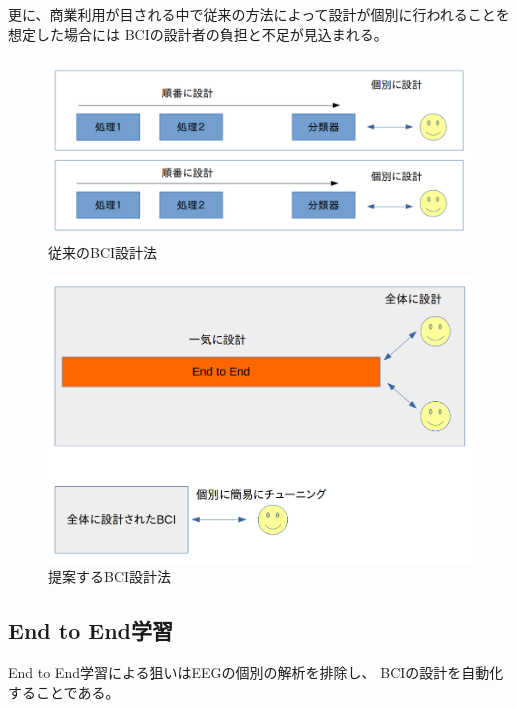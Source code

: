 更に、商業利用が目される中で従来の方法によって設計が個別に行われることを想定した場合には
BCIの設計者の負担と不足が見込まれる。

\begin{figure}[pt]
    \centering
    \includegraphics[width=13cm]{images/jurai.png}
    \caption{従来のBCI設計法}
    \label{fig:hikaku1}
\end{figure}
\begin{figure}[pt]
    \centering
    \includegraphics[width=13cm]{images/teian.png}
    \caption{提案するBCI設計法}
    \label{fig:hikaku2}
\end{figure}

\subsection{End to End学習}
End to End学習による狙いはEEGの個別の解析を排除し、
BCIの設計を自動化することである。

